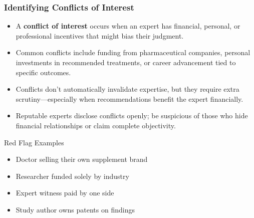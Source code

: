 \documentclass{beamer}
\begin{document}
	\begin{frame}
		\frametitle{Identifying Conflicts of Interest}
		\begin{itemize}
			\item A \textbf{conflict of interest} occurs when an expert has financial, personal, or professional incentives that might bias their judgment.
			\item Common conflicts include funding from pharmaceutical companies, personal investments in recommended treatments, or career advancement tied to specific outcomes.
			\item Conflicts don't automatically invalidate expertise, but they require extra scrutiny—especially when recommendations benefit the expert financially.
			\item Reputable experts disclose conflicts openly; be suspicious of those who hide financial relationships or claim complete objectivity.
		\end{itemize}
		
		\begin{alertblock}{Red Flag Examples}
			\begin{itemize}
				\item Doctor selling their own supplement brand
				\item Researcher funded solely by industry
				\item Expert witness paid by one side
				\item Study author owns patents on findings
			\end{itemize}
		\end{alertblock}
	\end{frame}
	
\end{document}
